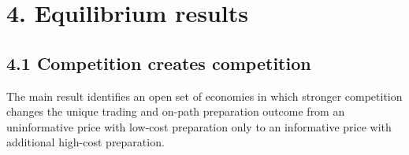 
\section{4. Equilibrium results}\label{sec-results}

\subsection{4.1 Competition creates
competition}\label{sec-competition-creates-competition}

The main result identifies an open set of economies in which stronger
competition changes the unique trading and on-path preparation outcome
from an uninformative price with low-cost preparation only to an
informative price with additional high-cost preparation.

